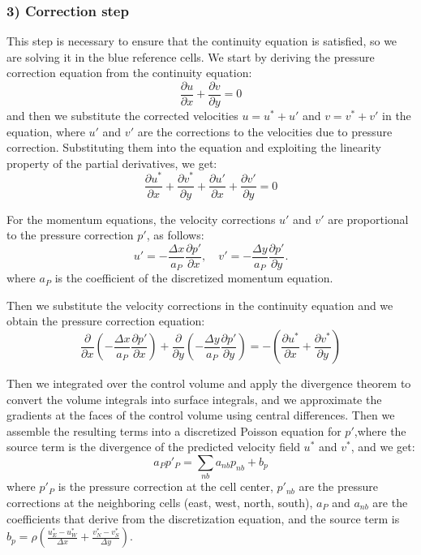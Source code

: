 \documentclass{article}
\begin{document}
\subsubsection*{3) Correction step}
This step is necessary to ensure that the continuity equation is satisfied, so we are solving it in the blue reference cells. 
We start by deriving the pressure correction equation from the continuity equation:
\begin{equation}
  \frac{\partial u}{\partial x} + \frac{\partial v}{\partial y} = 0
\end{equation}
and then we substitute the corrected velocities $u = u^* + u'$ and $v = v^* + v'$ in the equation, where $u'$ and $v'$ are the corrections to the velocities due to pressure correction. 
Substituting them into the equation and exploiting the linearity property of the partial derivatives, we get:
\begin{equation}
  \frac{\partial u^*}{\partial x} + \frac{\partial v^*}{\partial y} + \frac{\partial u'}{\partial x} + \frac{\partial v'}{\partial y} = 0
\end{equation}

For the momentum equations, the velocity corrections $u'$ and $v'$ are proportional to the pressure correction $p'$, as follows:
\begin{equation}
  u' = -\frac{\Delta x}{a_P} \frac{\partial p'}{\partial x}, \quad v' = -\frac{\Delta y}{a_P} \frac{\partial p'}{\partial y}.
\end{equation}
where $a_P$ is the coefficient of the discretized momentum equation.

Then we substitute the velocity corrections in the continuity equation and we obtain the pressure correction equation:
\begin{equation}
  \frac{\partial}{\partial x}\left(-\frac{\Delta x}{a_P}\frac{\partial p'}{\partial x}\right) + \frac{\partial}{\partial y}\left(-\frac{\Delta y}{a_P}\frac{\partial p'}{\partial y}\right) = -\left(\frac{\partial u^*}{\partial x} + \frac{\partial v^*}{\partial y}\right)
\end{equation}

Then we integrated over the control volume and apply the divergence theorem to convert the volume integrals into surface integrals, and we approximate the gradients at the faces of the control volume using central differences.
Then we assemble the  resulting terms into a discretized Poisson equation for $p'$,where the source term is the divergence of the predicted velocity field $u^*$ and $v^*$, and we get:
\begin{equation}
  a_P p'_P = \sum_{nb} a_{nb} p_{nb} + b_p
\end{equation} 
where $p'_P$ is the pressure correction at the cell center, $p'_{nb}$ are the pressure corrections at the neighboring cells (east, west, north, south), $a_P$ and $a_{nb}$ are the coefficients that derive from the discretization equation, and the source term is $b_p = \rho \left( \frac{u_E^* - u_W^*}{\Delta x} + \frac{v_N^* - v_S^*}{\Delta y} \right)$. 
\end{document}
